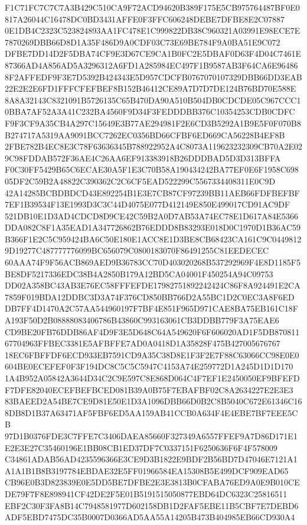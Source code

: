 \documentclass[UTF8,fontset=fandol,zihao=-4,a4paper]{ctexart}
\begin{document}
{{F1C71FC7C7C7A3B429C510CA9F72ACD94620B389F175E5CB975764487BF0E0817A26044C16478DC0BD3431AFFE0F3FFC606248DEBE7DFBE8E2C07887
0E1DB4C2323C523824893AA1FC478E1C999822DB38C960321A03991E98ECE7E7870269DBB66D8D1A35F486D9A0CDF03C73E69BE784F9A0BA51E9C072
DFBE7DD14D2F5DBA74CF9E3D67CE9CA1B0FC2E5DBAF0D63F4D04C7461E87366AD4A856AD5A3296312A6FD1A285984EC497F1B9587AB3F64CA6E96486
8F2AFFEDF9F3E7D5392B424343E5D957CDCFB0767070107329DBB66DD3EAB22E2E2E6FD1FFFCFEFBEF8B152B46412CE89A7D7D7DE124B76BD70E588E
8A8A32143C8321091B5726135C65B470DA90A510B504DB0CDCDE05C967CCC10BBA7AF52A3A41C232BA4560F9D34F3FEDDDBB376C10354253CDB0CDFC
F9F3CF9A35CB4A297C15649E3B77AE294981F2E6CD3B5292A1B9E5F0F070B8B274717A5319AA9091BCC7262EC0356BD66CFBF6ED669CA56228B4EF8B
2FBE782B4EC8E3C78F63636345B788922952A4C8073A119623232309CB70A2E029C98FDDAB572F36AE4C26AA6EF913383918B26DDDBAD5D3D313BFFA
F0C30FF5429B65C6ECAE30A5F1E3C70B58A190434242BA77EF0E6F1958C69805DF2C59B2A48822C390362C2C6CF5EAD522299C5567334408311E0C9D
42A14285BCBDBDCD43E892254B1E3E7CB87CF97239BB11AEB66FDFBEFBF7EF1B39534F13E1993D3C3C44D4075E077D412149E850E499017CD91AC9DF
521DB10E1D3AD4CDCD8D9CE42C59B2A0D7AB53A74EC78E1D617A84E5366DDA082C8F1A35EAD1A347726862B76EDDD8B83293E018D0C1970D1B36AC59
B366F1E2C5C959424BA6C50E180E1ACC8E1D3BE8CB68423CA161C9C04498129D19277C487777776099BC656079C0800183070F86491255C81EEDECEC
60AAA74F9F56ACB869AED9B36783CC70D403020268B537292969F4E8D1185F5BE8DF5217336EDC38B4A2850B179A12BD5CA04001F450254A94C09753
DD02A358BC43AB3E76EC58FFFEFDE17982751892242424C86F8A924491E2CA7859F019BDA12DDBC3D3A74F376CD850BB766D2A55BC1D2C0EC3A8F6ED
DB7FF4D1470A2C57AA544960197F7BF4E851F965D971CAE8BA75EB161C18FA193F50D2B08888083406786B43860C993163061CB3DDBB779F3A75EAE6
CD9BE20FB76DDB86AF4D9F3E5D648C64A549620F6F606020AD1F5DB87081167704963FFBEC3381E5AFBFFE7AD0A0418D1A35828F475B427005676767
18EC6FBFFDF6ECD933EB7591CD9A35C38D8E1F3F2E7F88C63066CC98E0E0604BE0ECEFEF0F3F194DC8C5C5C5947C4153A74E259772D1A245D1D1D170
1A4B952A05842A3644D34C2C9E597C8E868D064C4F7EF1E2450050EF9BFEFDF7DFE82040ECEFBEFBCED081B39A0B75F7EBAFBF02C8A2634227E2E3E3
83BAEED2A54BE7CE9D81E50E1D3A1096DBB66D0B2C8B5040C672E61346C168DB8D1B37A63471AF5FBF6ED5AA159AB41CCB0A634F4E4EBE7BF7EEE5CB
97D1B0376FDE3C7FFE7C3406DAEA85660F327349A6557FFEF9A7D86D171E1E2E3E27C35460196E1BB08CB1ED37DF7C0337151F6250636F6F4F578009
C34861ADAB56AD4235596366E3CE9D3B1822E9BDF2B56BD7D47046E7121A1A1A1B1B8B3197784EBDAE32E5FF01966584EA15308B5E499DCF909EAD65
CB96E0B3D823839E0E5DD5BE7DFBE2E3E3813B0CFABA76ED9A0E9B010CEDE79F7F8E898941CF42DE2F5E01B5191515050877EBD64DC6323C25816511
EBF2C30F3FA8B14C7948581977D602158DB1D2FAF5EBE11B5CBF7E7DEBD6ADF5EBD7475DC35B0007D0366AD5AA55A14205B473B404985EB66CD930A4
}}
\end{document}
